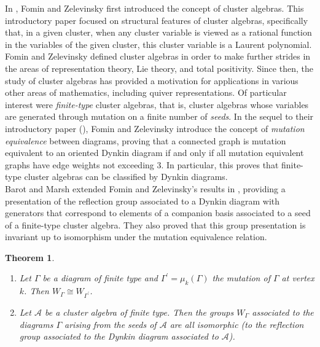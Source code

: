 \documentclass[11pt]{amsart}
\newtheorem{thm}{Theorem}[section]
\theoremstyle{definition}
\begin{document}
In \cite{FZ02}, Fomin and Zelevinsky first introduced the concept of cluster algebras. This introductory paper focused on structural features of cluster algebras, specifically that, in a given cluster, when any cluster variable is viewed as a rational function in the variables of the given cluster, this cluster variable is a Laurent polynomial.  Fomin and Zelevinsky defined cluster algebras in order to make further strides in the areas of representation theory, Lie theory, and total positivity. Since then, the study of cluster algebras has provided a motivation for applications in various other areas of mathematics, including quiver representations. Of particular interest were \textit{finite-type} cluster algebras, that is, cluster algebras whose variables are generated through mutation on a finite number of \textit{seeds}. In the sequel to their introductory paper (\cite{FZ03}), Fomin and Zelevinsky introduce the concept of \textit{mutation equivalence} between diagrams, proving that a connected graph is mutation equivalent to an oriented Dynkin diagram if and only if all mutation equivalent graphs have edge weights not exceeding 3. In particular, this proves that finite-type cluster algebras can be classified by Dynkin diagrams. \\
\indent Barot and Marsh extended Fomin and Zelevinsky's results in \cite{BM13}, providing a presentation of the reflection group associated to a Dynkin diagram with generators that correspond to elements of a companion basis associated to a seed of a finite-type cluster algebra. They also proved that this group presentation is invariant up to isomorphism under the mutation equivalence relation.


\begin{thm}\cite[Theorem 5.4]{BM13}
\begin{enumerate}
\item Let $\Gamma$ be a diagram of finite type and $\Gamma^{\prime} = \mu_k(\Gamma)$ the mutation of $\Gamma$ at vertex $k$. Then $W_{\Gamma} \cong W_{\Gamma^{\prime}}$.
\item Let $\mathscr{A}$ be a cluster algebra of finite type. Then the groups $W_{\Gamma}$ associated to the diagrams $\Gamma$ arising from the seeds of $\mathscr{A}$ are all isomorphic (to the reflection group associated to the Dynkin diagram associated to $\mathscr{A}$).
\end{enumerate}
\end{thm}
\end{document}
